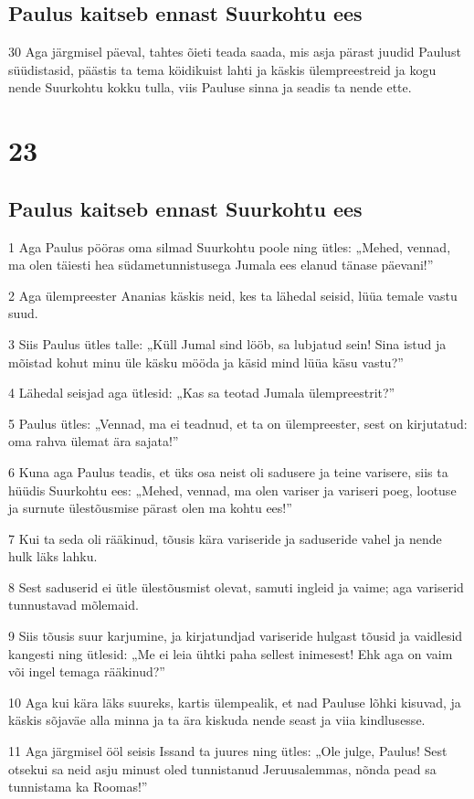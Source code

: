 \section*{Paulus kaitseb ennast Suurkohtu ees}

\par 30 Aga järgmisel päeval, tahtes õieti teada saada, mis asja pärast juudid Paulust süüdistasid, päästis ta tema köidikuist lahti ja käskis ülempreestreid ja kogu nende Suurkohtu kokku tulla, viis Pauluse sinna ja seadis ta nende ette.


\chapter{23}

\section*{Paulus kaitseb ennast Suurkohtu ees}

\par 1 Aga Paulus pööras oma silmad Suurkohtu poole ning ütles: „Mehed, vennad, ma olen täiesti hea südametunnistusega Jumala ees elanud tänase päevani!”
\par 2 Aga ülempreester Ananias käskis neid, kes ta lähedal seisid, lüüa temale vastu suud.
\par 3 Siis Paulus ütles talle: „Küll Jumal sind lööb, sa lubjatud sein! Sina istud ja mõistad kohut minu üle käsku mööda ja käsid mind lüüa käsu vastu?”
\par 4 Lähedal seisjad aga ütlesid: „Kas sa teotad Jumala ülempreestrit?”
\par 5 Paulus ütles: „Vennad, ma ei teadnud, et ta on ülempreester, sest on kirjutatud: oma rahva ülemat ära sajata!”
\par 6 Kuna aga Paulus teadis, et üks osa neist oli sadusere ja teine varisere, siis ta hüüdis Suurkohtu ees: „Mehed, vennad, ma olen variser ja variseri poeg, lootuse ja surnute ülestõusmise pärast olen ma kohtu ees!”
\par 7 Kui ta seda oli rääkinud, tõusis kära variseride ja saduseride vahel ja nende hulk läks lahku.
\par 8 Sest saduserid ei ütle ülestõusmist olevat, samuti ingleid ja vaime; aga variserid tunnustavad mõlemaid.
\par 9 Siis tõusis suur karjumine, ja kirjatundjad variseride hulgast tõusid ja vaidlesid kangesti ning ütlesid: „Me ei leia ühtki paha sellest inimesest! Ehk aga on vaim või ingel temaga rääkinud?”
\par 10 Aga kui kära läks suureks, kartis ülempealik, et nad Pauluse lõhki kisuvad, ja käskis sõjaväe alla minna ja ta ära kiskuda nende seast ja viia kindlusesse.
\par 11 Aga järgmisel ööl seisis Issand ta juures ning ütles: „Ole julge, Paulus! Sest otsekui sa neid asju minust oled tunnistanud Jeruusalemmas, nõnda pead sa tunnistama ka Roomas!”

